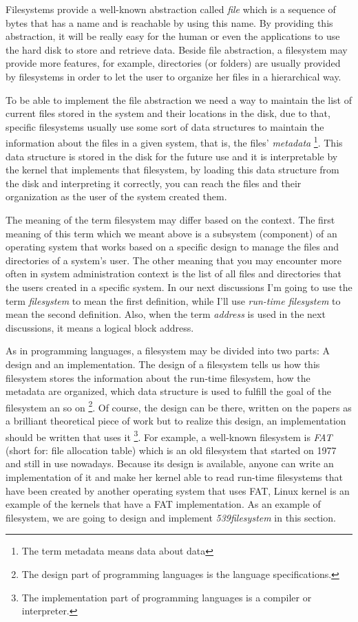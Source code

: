 Filesystems provide a well-known abstraction called \emph{file} which is
a sequence of bytes that has a name and is reachable by using this name.
By providing this abstraction, it will be really easy for the human or
even the applications to use the hard disk to store and retrieve data.
Beside file abstraction, a filesystem may provide more features, for
example, directories (or folders) are usually provided by filesystems in
order to let the user to organize her files in a hierarchical way.

To be able to implement the file abstraction we need a way to maintain
the list of current files stored in the system and their locations in
the disk, due to that, specific filesystems usually use some sort of
data structures to maintain the information about the files in a given
system, that is, the files' \emph{metadata} \footnote{The term metadata
  means data about data}. This data structure is stored in the disk for
the future use and it is interpretable by the kernel that implements
that filesystem, by loading this data structure from the disk and
interpreting it correctly, you can reach the files and their
organization as the user of the system created them.

The meaning of the term filesystem may differ based on the context. The
first meaning of this term which we meant above is a subsystem
(component) of an operating system that works based on a specific design
to manage the files and directories of a system's user. The other
meaning that you may encounter more often in system administration
context is the list of all files and directories that the users created
in a specific system. In our next discussions I'm going to use the term
\emph{filesystem} to mean the first definition, while I'll use
\emph{run-time filesystem} to mean the second definition. Also, when the
term \emph{address} is used in the next discussions, it means a logical
block address.

As in programming languages, a filesystem may be divided into two parts:
A design and an implementation. The design of a filesystem tells us how
this filesystem stores the information about the run-time filesystem,
how the metadata are organized, which data structure is used to fulfill
the goal of the filesystem an so on \footnote{The design part of
  programming languages is the language specifications.}. Of course, the
design can be there, written on the papers as a brilliant theoretical
piece of work but to realize this design, an implementation should be
written that uses it \footnote{The implementation part of programming
  languages is a compiler or interpreter.}. For example, a well-known
filesystem is \emph{FAT} (short for: file allocation table) which is an
old filesystem that started on 1977 and still in use nowadays. Because
its design is available, anyone can write an implementation of it and
make her kernel able to read run-time filesystems that have been created
by another operating system that uses FAT, Linux kernel is an example of
the kernels that have a FAT implementation. As an example of filesystem,
we are going to design and implement \emph{539filesystem} in this
section.

